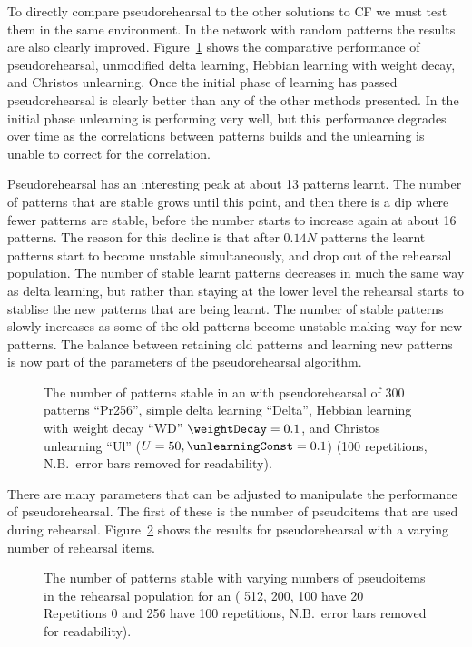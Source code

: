To directly compare pseudorehearsal to the other solutions to CF we must test them in the same environment. In the  network with random patterns the results are also clearly improved.  Figure~\ref{fig:PRComp} shows the comparative performance of pseudorehearsal, unmodified delta learning, Hebbian learning with weight decay, and Christos unlearning.  Once the initial phase of learning has passed pseudorehearsal is clearly better than any of the other methods presented.  In the initial phase unlearning is performing very well, but this performance degrades over time as the correlations between patterns builds and the unlearning is unable to correct for the correlation.  

Pseudorehearsal has an interesting peak at about 13 patterns learnt.  The number of patterns that are stable grows until this point, and then there is a dip where fewer patterns are stable, before the number starts to increase again at about 16 patterns.  The reason for this decline is that after $0.14N$ patterns the learnt patterns start to become unstable simultaneously, and drop out of the rehearsal population.  The number of stable learnt patterns decreases in much the same way as delta learning, but rather than staying at the lower level the rehearsal starts to stablise the new patterns that are being learnt.  The number of stable patterns slowly increases as some of the old patterns become unstable making way for new patterns.  The balance between retaining old patterns and learning new patterns is now part of the parameters of the pseudorehearsal algorithm.

\begin{figure}[tbp]
\small
	\centering
		 
	\caption{The number of patterns stable in an  with pseudorehearsal of 300 patterns ``Pr256'', simple delta learning ``Delta'', Hebbian learning with weight decay ``WD'' $\weightDecay = 0.1$, and Christos unlearning ``Ul'' ($U = 50, \unlearningConst = 0.1$) (100 repetitions, N.B.\ error bars removed for readability).}
	\label{fig:PRComp}
\end{figure}

There are many parameters that can be adjusted to manipulate the performance of pseudorehearsal.  The first of these is the number of pseudoitems that are used during rehearsal.  Figure~\ref{fig:PR100-1000items} shows the results for pseudorehearsal with a varying number of rehearsal items. 

\begin{figure}[tbp]
\small
	\centering
	
	\caption{The number of patterns stable with varying numbers of pseudoitems in the rehearsal population for an  ( 512, 200, 100 have 20 Repetitions 0 and 256 have 100 repetitions, N.B.\ error bars removed for readability).}
	\label{fig:PR100-1000items}
\end{figure}

